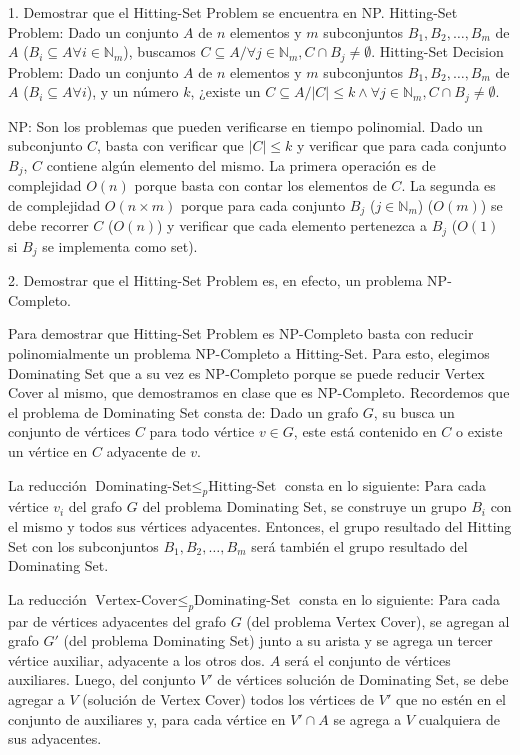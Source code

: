 1. Demostrar que el Hitting-Set Problem se encuentra en NP.
Hitting-Set Problem:
Dado un conjunto $A$ de $n$ elementos y $m$ subconjuntos $B_{1},B_{2},\dots,B_{m}$ de $A$ ($B_{i}\subseteq A \forall i \in \mathbb{N}_{m}$), buscamos $C \subseteq A / \forall j \in \mathbb{N}_{m},  C \cap B_{j}\neq \emptyset$.
Hitting-Set Decision Problem:
Dado un conjunto $A$ de $n$ elementos y $m$ subconjuntos $B_{1},B_{2},\dots,B_{m}$ de $A$ ($B_{i}\subseteq A \forall i$), y un número $k$, ¿existe un $C \subseteq A / \left| C \right|\leq k \land \forall j \in \mathbb{N}_{m},  C \cap B_{j}\neq \emptyset$.

NP: Son los problemas que pueden verificarse en tiempo polinomial.
Dado un subconjunto $C$, basta con verificar que $\left| C \right|\leq k$ y verificar que para cada conjunto $B_{j}$, $C$ contiene algún elemento del mismo.
La primera operación es de complejidad $O(n)$ porque basta con contar los elementos de $C$.
La segunda es de complejidad $O(n×m)$ porque para cada conjunto $B_{j}$ ($j \in \mathbb{N}_{m}$) ($O(m)$) se debe recorrer $C$ ($O(n)$) y verificar que cada elemento pertenezca a $B_{j}$ ($O(1)$ si $B_{j}$ se implementa como set).

2. Demostrar que el Hitting-Set Problem es, en efecto, un problema NP-Completo.

Para demostrar que Hitting-Set Problem es NP-Completo basta con reducir polinomialmente un problema NP-Completo a Hitting-Set. Para esto, elegimos Dominating Set que a su vez es NP-Completo porque se puede reducir Vertex Cover al mismo, que demostramos en clase que es NP-Completo.
Recordemos que el problema de Dominating Set consta de: Dado un grafo $G$, su busca un conjunto de vértices $C$ para todo vértice $v \in G$, este está contenido en $C$ o existe un vértice en $C$ adyacente de $v$.

La reducción $\text{Dominating-Set} \leq _{p} \text{Hitting-Set}$ consta en lo siguiente:
Para cada vértice $v_{i}$ del grafo $G$ del problema Dominating Set, se construye un grupo $B_{i}$ con el mismo y todos sus vértices adyacentes. Entonces, el grupo resultado del Hitting Set con los subconjuntos $B_{1},B_{2},\dots,B_{m}$ será también el grupo resultado del Dominating Set.

La reducción $\text{Vertex-Cover} \leq _{p} \text{Dominating-Set}$ consta en lo siguiente:
Para cada par de vértices adyacentes del grafo $G$ (del problema Vertex Cover), se agregan al grafo $G'$ (del problema Dominating Set) junto a su arista y se agrega un tercer vértice auxiliar, adyacente a los otros dos. $A$ será el conjunto de vértices auxiliares. Luego, del conjunto $V'$ de vértices solución de Dominating Set, se debe agregar a $V$ (solución de Vertex Cover) todos los vértices de $V'$ que no estén en el conjunto de auxiliares y, para cada vértice en $V' \cap A$ se agrega a $V$ cualquiera de sus adyacentes.

